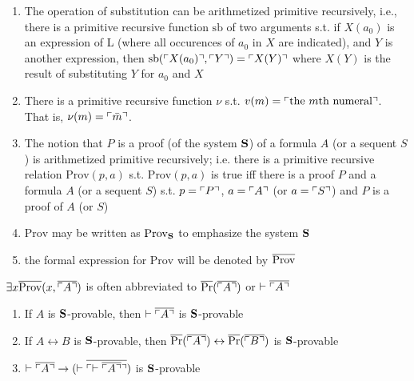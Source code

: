 \documentclass[11pt]{article}
\def \Pr {\text{Pr}}
\def \sb {\text{sb}}
\def \Prov {\text{Prov}}
\begin{document}
\begin{lemma}[]
\label{lemma10.8}
\begin{enumerate}
\item The operation of substitution can be arithmetized primitive recursively, i.e., there is a
primitive recursive function \(\sb\) of two arguments s.t. if \(X(a_0)\) is an expression of L
(where all occurences of \(a_0\) in \(X\) are indicated), and \(Y\) is another expression,
then \(\sb(\ucorner{X(a_0)},\ucorner{Y})=\ucorner{X(Y)}\) where \(X(Y)\) is the result of
substituting \(Y\) for \(a_0\) and \(X\)
\item There is a primitive recursive function \(\nu\) s.t.
\(v(m)=\ulcorner \text{the $m$th numeral} \urcorner\). That is, \(\nu(m)=\ulcorner \bar{m} \urcorner\).
\item The notion that \(P\) is a proof (of the system \(\operatorname{\textbf{S}}\)) of a formula \(A\) (or a
sequent \(S\)) is arithmetized primitive recursively; i.e. there is a primitive recursive
relation \(\Prov(p,a)\) s.t. \(\Prov(p,a)\) is true iff there is a proof \(P\) and a
formula \(A\) (or a sequent \(S\)) s.t. \(p=\ulcorner P \urcorner\), \(a=\ulcorner A \urcorner\)
(or \(a=\ulcorner S \urcorner\)) and \(P\) is a proof of \(A\) (or \(S\))
\item \(\Prov\) may be written as \(\Prov_{\bS}\) to emphasize the system \(\operatorname{\textbf{S}}\)
\item the formal expression for \(\Prov\) will be denoted by \(\ove{\Prov}\)
\end{enumerate}
\end{lemma}

\(\exists x\ove{\Prov}(x,\ove{\ucorner{A}})\) is often abbreviated to \(\ove{\Pr}(\ove{\ucorner{A}})\)
or \(\vdash\overline{\ulcorner A \urcorner}\)

\begin{proposition}[]
\label{prop10.9}
\begin{enumerate}
\item If \(A\) is \(\operatorname{\textbf{S}}\)-provable, then \(\vdash\overline{\ulcorner A \urcorner}\) is \(\operatorname{\textbf{S}}\)-provable
\item If \(A\leftrightarrow B\) is \(\operatorname{\textbf{S}}\)-provable,
then \(\ove{\Pr}(\ove{\ucorner{A}})\leftrightarrow\ove{\Pr}(\ove{\ucorner{B}})\) is \(\operatorname{\textbf{S}}\)-provable
\item \(\vdash\overline{\ulcorner A \urcorner}\to(\vdash\overline{\ulcorner \vdash\overline{\ulcorner A \urcorner} \urcorner})\) is \(\operatorname{\textbf{S}}\)-provable
\end{enumerate}
\end{proposition}
\end{document}
